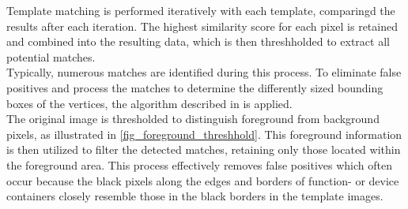 Template matching is performed iteratively with each template, comparingd the results after each iteration. The highest similarity score for each pixel is retained and combined into the resulting data, which is then threshholded to extract all potential matches.\\
Typically, numerous matches are identified during this process. To eliminate false positives and process the matches to determine the differently sized bounding boxes of the vertices, the algorithm described in \cite{og_paper} is applied.\\
The original image is thresholded to distinguish foreground from background pixels, as illustrated in \ref{fig_foreground_threshhold}. This foreground information is then utilized to filter the detected matches, retaining only those located within the foreground area. This process effectively removes false positives which often occur because the black pixels along the edges and borders of function- or device containers closely resemble those in the black borders in the template images.

